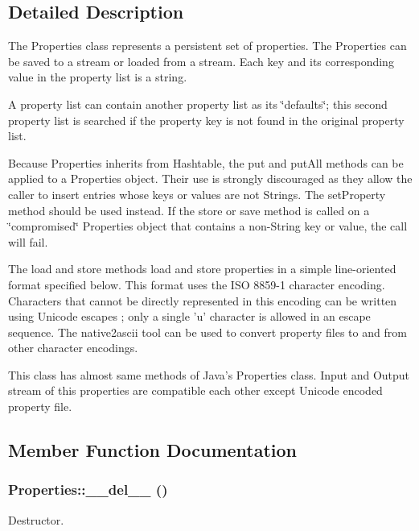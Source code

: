 \subsection{Detailed Description}
The Properties class represents a persistent set of properties. The Properties can be saved to a stream or loaded from a stream. Each key and its corresponding value in the property list is a string.

A property list can contain another property list as its \char`\"{}defaults\char`\"{}; this second property list is searched if the property key is not found in the original property list.

Because Properties inherits from Hashtable, the put and put\-All methods can be applied to a Properties object. Their use is strongly discouraged as they allow the caller to insert entries whose keys or values are not Strings. The set\-Property method should be used instead. If the store or save method is called on a \char`\"{}compromised\char`\"{} Properties object that contains a non-String key or value, the call will fail.

The load and store methods load and store properties in a simple line-oriented format specified below. This format uses the ISO 8859-1 character encoding. Characters that cannot be directly represented in this encoding can be written using Unicode escapes ; only a single 'u' character is allowed in an escape sequence. The native2ascii tool can be used to convert property files to and from other character encodings.

This class has almost same methods of Java's Properties class. Input and Output stream of this properties are compatible each other except Unicode encoded property file.



\subsection{Member Function Documentation}
\subsubsection{\setlength{\rightskip}{0pt plus 5cm}Properties::\_\-\_\-del\_\-\_\- ()}\label{classProperties_Propertiesa2}


Destructor. 


